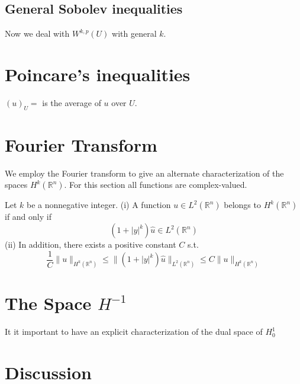 \subsection{General Sobolev inequalities}
Now we deal with $W^{k,p}(U)$ with general $k$.


\section{Poincare's inequalities}
\begin{notation}
    $(u)_U=$ is the average of $u$ over $U$.
\end{notation}

\section{Fourier Transform}
We employ the Fourier transform to give an alternate characterization of the spaces $H^k(\mathbb{R}^n)$.
For this section all functions are complex-valued.
\begin{theorem}
    Let $k$ be a nonnegative integer.\newline 
    (i) A function $u\in L^2(\mathbb{R}^n)$ belongs to $H^k(\mathbb{R}^n)$ if and only if 
    \[ (1+|y|^k)\hat{u}\in L^2(\mathbb{R}^n)\] 
    (ii) In addition, there exists a positive constant $C$ s.t. 
    \[ \frac{1}{C}\|u\|_{H^k(\mathbb{R}^n)}\le \| (1+|y|^k)\hat{u}\|_{L^2(\mathbb{R}^n)}\le C\|u\|_{H^k(\mathbb{R}^n)} \]
\end{theorem}


\section{\texorpdfstring{The Space $H^{-1}$}{The Space H-1}}
It it important to have an explicit characterization of the dual space of $H^1_0$

\section{Discussion}

\citet{alma990019861400106761}